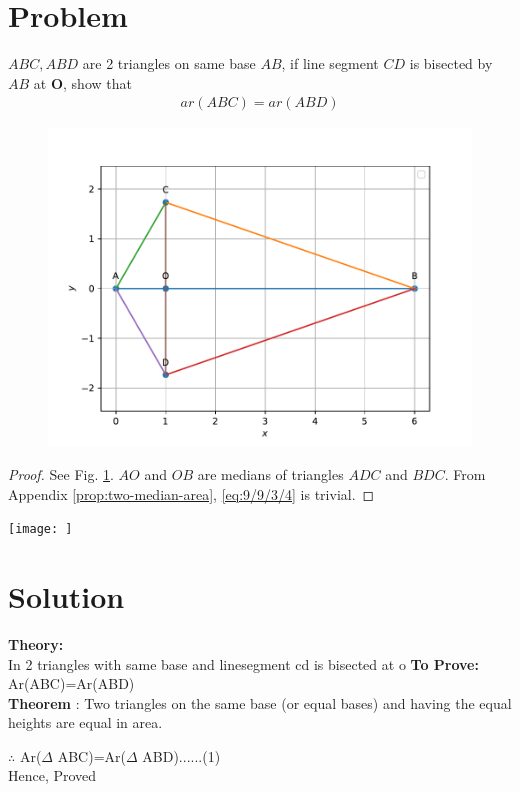 \documentclass[10pt, a4paper]{article}
\title{\mytitle}
\author{\myauthor\hspace{1em}\\\contact\\FWC22031\hspace{6.5em}IITH\hspace{0.5em}\mymodule\hspace{6em}ASSIGN-5}
\date{}
\let\vec\mathbf
\begin{document}
	\maketitle
	\tableofcontents
   \section{Problem}
   \fi
   $ABC, ABD$ are 2 triangles on same base $AB$, if line segment $CD$ is bisected by $AB$ at $\vec{O}$, show that 
   \begin{align}
		\label{eq:9/9/3/4}
 ar (ABC) = ar (ABD)  
   \end{align}
	\begin{figure}[!h]
		\centering
 \includegraphics[width=\columnwidth]{chapters/9/9/3/4/figs/figa6.pdf}
		\caption{}
		\label{fig:9/9/3/4}
  	\end{figure}
	\begin{proof}
		See Fig. 
		\ref{fig:9/9/3/4}. $AO$ and $OB$ are medians of triangles $ADC$ and $BDC$. From 
Appendix	  \ref{prop:two-median-area}, 
		\eqref{eq:9/9/3/4} is trivial.
	\end{proof}


\iffalse

	    \texttt{[image: ]}
   \section{Solution}
   \textbf{Theory:}\\
In 2 triangles with same base and linesegment cd is bisected at o  
\textbf{To Prove:} Ar(ABC)=Ar(ABD) \\
\textbf{Theorem} : Two triangles on the same base (or equal bases) and having the equal heights are equal in area.
\begin{center}
$\therefore$ Ar($\Delta$ ABC)=Ar($\Delta$ ABD)......(1)\\
Hence, Proved    
\end{center}
\end{document}
